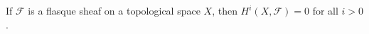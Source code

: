 If $\mathcal{F}$ is a flasque sheaf on a topological space $X$, then $H^i(X, \mathcal{F}) = 0$ for all $i > 0$.
